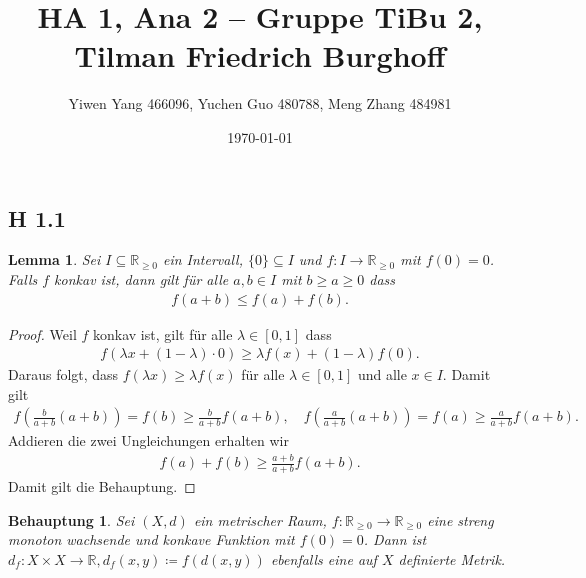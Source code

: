 \documentclass[draft,a5paper]{article}
\author{Yiwen Yang 466096, Yuchen Guo 480788, Meng Zhang 484981}
\date{\today}
\title{HA 1, Ana 2 -- Gruppe TiBu 2, Tilman Friedrich Burghoff}
\newtheorem*{beh}{Behauptung}
\newtheorem*{lem}{Lemma}
\begin{document}
\maketitle

\newpage

\subsection*{H 1.1}

\begin{lem}
  Sei \(I \subseteq \mathbb{R}_{\ge 0}\) ein Intervall,
  \(\{0\} \subseteq I\) und \(f\colon I \to \mathbb{R}_{\ge 0}\) mit
  \(f(0) = 0\).  Falls \(f\) konkav ist, dann gilt für alle
  \(a, b \in I\) mit \(b \ge a \ge 0\) dass
  \begin{align*}
    f(a + b) \le f(a) + f(b).
  \end{align*}
\end{lem}

\begin{proof}
  Weil \(f\) konkav ist, gilt für alle \(\lambda \in [0, 1]\) dass
  \begin{align*}
    f(\lambda x + (1 - \lambda) \cdot 0) \ge \lambda f(x) + (1 - \lambda) f(0).
  \end{align*}
  Daraus folgt, dass \(f(\lambda x) \ge \lambda f(x)\) für alle \(\lambda \in [0, 1]\) und
  alle \(x \in I\).  Damit gilt
  \begin{align*}
    f\left( \frac{b}{a+b} (a+b)\right) = f(b) \ge \frac{b}{a+b} f(a+b), \quad
    f\left( \frac{a}{a+b} (a+b)\right) = f(a) \ge \frac{a}{a+b} f(a+b).
  \end{align*}
  Addieren die zwei Ungleichungen erhalten wir
  \begin{align*}
    f(a) + f(b) \ge \frac{a+b}{a+b} f(a+b).
  \end{align*}
  Damit gilt die Behauptung.
\end{proof}

\begin{beh}
  Sei \((X, d)\) ein metrischer Raum,
  \(f \colon \mathbb{R}_{\ge 0} \to \mathbb{R}_{\ge 0}\) eine streng monoton wachsende und konkave
  Funktion mit \(f(0) = 0\).  Dann ist
  \(d_{f} \colon X \times X \to \mathbb{R}, d_{f}(x, y) \coloneq f(d(x, y))\) ebenfalls eine auf
  \(X\) definierte Metrik.
\end{beh}
\end{document}
